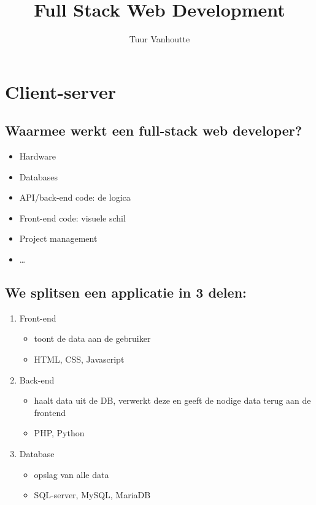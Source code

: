 \documentclass{article}
\begin{document}
\begin{titlepage}
    \author{Tuur Vanhoutte}
    \title{Full Stack Web Development}
\end{titlepage}

\maketitle
\newpage
\tableofcontents
\newpage


\section {Client-server}

\subsection{Waarmee werkt een full-stack web developer?}
\begin{itemize}
    \item Hardware  
    \item Databases
    \item API/back-end code: de logica
    \item Front-end code: visuele schil
    \item Project management
    \item \dots
\end{itemize}

\subsection{We splitsen een applicatie in 3 delen:}
\begin{enumerate}
    \item Front-end
    \begin{itemize}
        \item toont de data aan de gebruiker
        \item HTML, CSS, Javascript
    \end{itemize}
    \item Back-end 
    \begin{itemize}
        \item haalt data uit de DB, verwerkt deze en geeft de nodige data terug aan de frontend
        \item PHP, Python
    \end{itemize}
    \item Database
    \begin{itemize}
        \item opslag van alle data 
        \item SQL-server, MySQL, MariaDB
    \end{itemize}
\end{enumerate}
\end{document}
